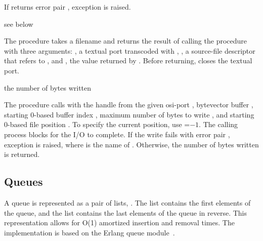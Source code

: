 If  returns error pair , exception  is raised.

\begin{procedure}
\end{procedure}
\returns{} see below

The  procedure takes a filename
 and returns the result of calling the procedure
 with three arguments: , a textual port
transcoded with , , a
source-file descriptor that refers to , and
, the value returned by .
Before returning,  closes the textual
port.

\begin{procedure}
\end{procedure}
\returns{} the number of bytes written

The  procedure calls  with
the handle from the given osi-port , bytevector buffer
, starting 0-based buffer index , maximum number of
bytes to write , and starting 0-based file position
. To specify the current position, use =$-1$. The
calling process blocks for the I/O to complete. If the write fails
with error pair , exception
 is raised, where
 is the name of . Otherwise, the number of bytes
written is returned.

\subsection {Queues}

A queue is represented as a pair of lists,
. The  list contains the first
elements of the queue, and the  list contains the last
elements of the queue in reverse. This representation allows for O(1)
amortized insertion and removal times. The implementation is based on
the Erlang queue module~\cite{queue-ref}.

